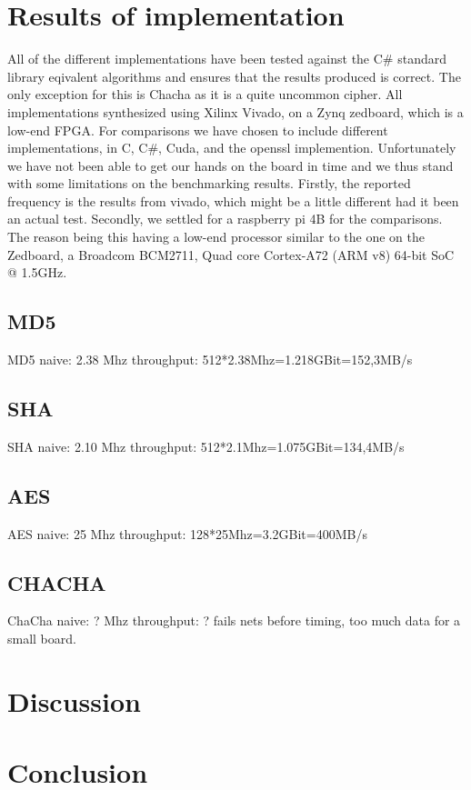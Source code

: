 \documentclass[a4paper]{article}
\begin{document}
\section{Results of implementation}
\label{sec:org5bf1889}
All of the different implementations have been tested against the C\# standard library eqivalent algorithms and ensures that the results produced is correct. The only exception for this is Chacha as it is a quite uncommon cipher. All implementations synthesized using Xilinx Vivado, on a Zynq zedboard, which is a low-end FPGA. For comparisons we have chosen to include different implementations, in C, C\#, Cuda, and the openssl implemention. Unfortunately we have not been able to get our hands on the board in time and we thus stand with some limitations on the benchmarking results. Firstly, the reported frequency is the results from vivado, which might be a little different had it been an actual test.  Secondly, we settled for a raspberry pi 4B for the comparisons. The reason being this having a low-end processor similar to the one on the Zedboard, a Broadcom BCM2711, Quad core Cortex-A72 (ARM v8) 64-bit SoC @ 1.5GHz.
\subsection{MD5}
\label{sec:org3ae9b3f}
MD5 naive: 2.38 Mhz
throughput: 512*2.38Mhz=1.218GBit=152,3MB/s
\subsection{SHA}
\label{sec:orgb9a07c3}
SHA naive: 2.10 Mhz
throughput: 512*2.1Mhz=1.075GBit=134,4MB/s

\subsection{AES}
\label{sec:org8d405e7}
AES naive: 25 Mhz
throughput: 128*25Mhz=3.2GBit=400MB/s

\subsection{CHACHA}
\label{sec:org7e8493b}
ChaCha naive: ? Mhz
throughput: ?
fails nets before timing, too much data for a small board.

\section{Discussion}
\label{sec:org63aa24e}

\section{Conclusion}
\label{sec:org56d194a}
\end{document}
